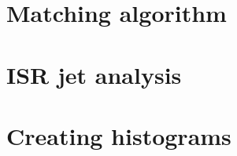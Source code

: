 \documentclass[12pt, oneside]{book}              %
\begin{document}
\begin{appendices}
\section[Matching algorithm]{Matching algorithm}\label{App:Matching_code}

\section[ISR jet analysis]{ISR jet analysis}\label{App:ISR_analysis}

\section[Creating histograms]{Creating histograms}\label{App:Creating_histos_code}



\end{appendices}




	
\end{document}
